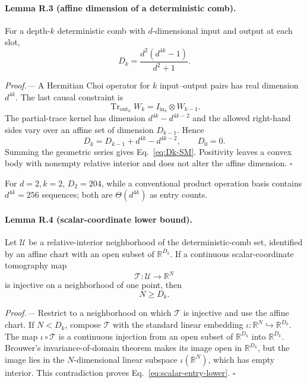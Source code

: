 \documentclass[aps,prl,reprint,superscriptaddress,nofootinbib]{revtex4-2}
\newcommand{\R}{\mathbb R}
\newcommand{\Tr}{\operatorname{Tr}}
\begin{document}
\paragraph{Lemma R.3 (affine dimension of a deterministic comb).}
For a depth-$k$ deterministic comb with $d$-dimensional input and output at each slot,
\begin{equation}
 D_k=\frac{d^2(d^{4k}-1)}{d^2+1}.
 \label{eq:Dk-SM}
\end{equation}

\emph{Proof.---}
A Hermitian Choi operator for $k$ input--output pairs has real dimension $d^{4k}$.  The last causal constraint is
\begin{equation}
 \Tr_{\mathrm{out}_k}W_k=I_{\mathrm{in}_k}\otimes W_{k-1}.
 \label{eq:comb-causal}
\end{equation}
The partial-trace kernel has dimension $d^{4k}-d^{4k-2}$ and the allowed right-hand sides vary over an affine set of dimension $D_{k-1}$.  Hence
\begin{equation}
 D_k=D_{k-1}+d^{4k}-d^{4k-2},
 \qquad D_0=0.
 \label{eq:Drecurrence}
\end{equation}
Summing the geometric series gives Eq.~\eqref{eq:Dk-SM}.  Positivity leaves a convex body with nonempty relative interior and does not alter the affine dimension. \hfill$\square$

For $d=2,k=2$, $D_2=204$, while a conventional product operation basis contains $d^{4k}=256$ sequences; both are $\Theta(d^{4k})$ as entry counts.

\paragraph{Lemma R.4 (scalar-coordinate lower bound).}
Let $\mathcal U$ be a relative-interior neighborhood of the deterministic-comb set, identified by an affine chart with an open subset of $\R^{D_k}$.  If a continuous scalar-coordinate tomography map
\begin{equation}
 \mathcal T:\mathcal U\longrightarrow\R^N
 \label{eq:scalar-tomography-map}
\end{equation}
is injective on a neighborhood of one point, then
\begin{equation}
 N\ge D_k.
 \label{eq:scalar-entry-lower}
\end{equation}

\emph{Proof.---}
Restrict to a neighborhood on which $\mathcal T$ is injective and use the affine chart.  If $N<D_k$, compose $\mathcal T$ with the standard linear embedding $\iota:\R^N\hookrightarrow\R^{D_k}$.  The map $\iota\circ\mathcal T$ is a continuous injection from an open subset of $\R^{D_k}$ into $\R^{D_k}$.  Brouwer's invariance-of-domain theorem makes its image open in $\R^{D_k}$, but the image lies in the $N$-dimensional linear subspace $\iota(\R^N)$, which has empty interior.  This contradiction proves Eq.~\eqref{eq:scalar-entry-lower}. \hfill$\square$
\end{document}
